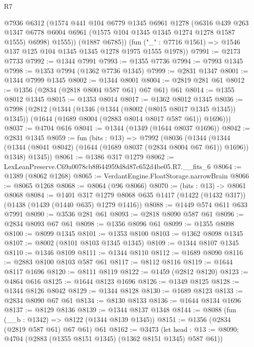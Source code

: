 \begin{lexlean}{R7}
\begin{coremodule}
          @7936
          @6312
          (@1574
            @441
            @104
            @6779
            @1345
            @6961
            @1278
            (@6316
              @439
              @263
              @1347
              @6778
              @6004
              @6961
              (@1575 @104 @1345 @1345 @1274 @1278 @1587 @1555)
              @6998)
            @1555))
        (@1887 @6785))
      (fun ("_" : @7716 @1561) => @1546 @137 @125 @104 @1345 @1345 @1278 @1975 @1555 @1978))
@7991 := @2173 @7733
@7992 := @1344 @7991
@7993 := @1355 @7736
@7994 := @7993 @1345
@7998 := @1353 @7994 (@1362 @7736 @1345)
@7999 := @2831 @1347
@8001 := @1344 @7999 @1345
@8002 := @1344 @8001
@8004 := @2819 @281 @61
@8012 := @1356 (@2834 (@2818 @8004 @587 @61) @67 @61) @61
@8014 := @1355 @8012 @1345
@8015 := @1353 @8014
@8017 := @1362 @8012 @1345
@8036 := @7998
    (@2812
      (@1344
        (@1346 (@1344 (@8002 (@8015 @8017 @1345 @1345)) @1345))
        (@1644 (@1689 @8004 (@2883 @8014 @8017 @587 @61)) @1696)))
@8037 := @4704 @616
@8041 := @1344 (@1349 (@1644 @8037 @1696))
@8042 := @2831 @1345
@8059 := fun (bits : @13) =>
  @7992
    (@8036
      (@1344
        (@1344 (@1344 (@8041 @8042) (@1644 (@1689 @8037 (@2834 @8004 @67 @61)) @1696)) @1348)
        @1345))
@8061 := @1386 @317 @1279
@8062 := LexLeanPreserve.C69a0078cb8f644959d8d87c652d4be05.R7.__fits_6
@8064 := @1389 (@8062 @1268)
@8065 := VerdantEngine.FloatStorage.narrowBrain
@8066 := @8065 @1268
@8068 := @8064 (@96 @8066)
@8070 := (bits : @13) -> @8061 @8068
@8084 := @1401
    @317
    @1279
    @8068
    @635
    @1417
    (@1422 (@1432 @317))
    (@1438 (@1439 (@1440 @635) @1279 @1416))
@8088 := @1449 @574 @611 @633 @7991
@8090 := @3536 @281 @61
@8093 := @2818 @8090 @587 @61
@8096 := @2834 @8093 @67 @61
@8098 := @1356 @8096 @61
@8099 := @1355 @8098
@8100 := @8099 @1345
@8101 := @1353 @8100
@8103 := @1362 @8098 @1345
@8107 := @8002 (@8101 @8103 @1345 @1345)
@8109 := @1344 @8107 @1345
@8110 := @1346 @8109
@8111 := @1344 @8110
@8112 := @1689 @8090
@8116 := @2883 @8100 @8103 @587 @61
@8117 := @8112 @8116
@8119 := @1644 @8117 @1696
@8120 := @8111 @8119
@8122 := @1459 (@2812 @8120)
@8123 := @4864 @616
@8125 := @1644 @8123 @1696
@8126 := @1349 @8125
@8128 := @1344 @8126 @8042
@8129 := @1344 @8128
@8130 := @1689 @8123
@8133 := @2834 @8090 @67 @61
@8134 := @8130 @8133
@8136 := @1644 @8134 @1696
@8137 := @8129 @8136
@8139 := @1344 @8137 @1348
@8144 := @8088 (fun (__b : @1342) => @8122 (@1344 @8139 @1345))
@8151 := @1356 (@2834 (@2819 @587 @61) @67 @61) @61
@8162 := @3473
    (let head : @13 := @8090; @4704 (@2883 (@1355 @8151 @1345) (@1362 @8151 @1345) @587 @61))

\end{coremodule}
\end{lexlean}
